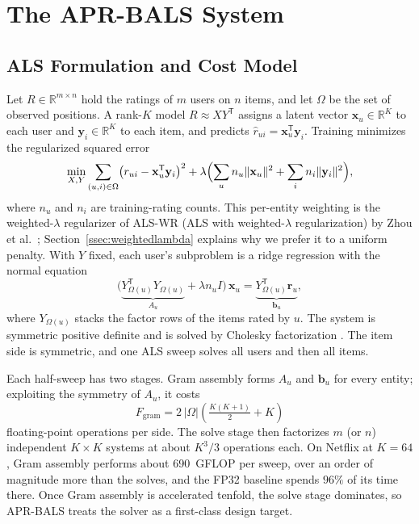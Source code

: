 \section{The APR-BALS System}
\label{sec:method}

\subsection{ALS Formulation and Cost Model}
\label{ssec:formulation}

Let $R \in \mathbb{R}^{m \times n}$ hold the ratings of $m$ users on $n$ items, and let $\Omega$ be the set of observed positions. A rank-$K$ model $R \approx XY^{\mathsf{T}}$ assigns a latent vector $\mathbf{x}_u \in \mathbb{R}^{K}$ to each user and $\mathbf{y}_i \in \mathbb{R}^{K}$ to each item, and predicts $\hat{r}_{ui} = \mathbf{x}_u^{\mathsf{T}}\mathbf{y}_i$. Training minimizes the regularized squared error
\begin{equation}
\min_{X,Y} \sum_{(u,i)\in\Omega} \bigl( r_{ui} - \mathbf{x}_u^{\mathsf{T}} \mathbf{y}_i \bigr)^{2}
+ \lambda \Bigl( \sum_{u} n_u \lVert \mathbf{x}_u \rVert^{2} + \sum_{i} n_i \lVert \mathbf{y}_i \rVert^{2} \Bigr),
\label{eq:mf_objective}
\end{equation}
where $n_u$ and $n_i$ are training-rating counts. This per-entity weighting is the weighted-$\lambda$ regularizer of ALS-WR (ALS with weighted-$\lambda$ regularization) by Zhou et al.\ \cite{zhou2008largescale}; Section~\ref{ssec:weightedlambda} explains why we prefer it to a uniform penalty. With $Y$ fixed, each user's subproblem is a ridge regression with the normal equation
\begin{equation}
\bigl( \underbrace{Y_{\Omega(u)}^{\mathsf{T}} Y_{\Omega(u)}}_{A_u} + \lambda n_u I \bigr)\, \mathbf{x}_u = \underbrace{Y_{\Omega(u)}^{\mathsf{T}} \mathbf{r}_u}_{\mathbf{b}_u},
\label{eq:als_update}
\end{equation}
where $Y_{\Omega(u)}$ stacks the factor rows of the items rated by $u$. The system is symmetric positive definite and is solved by Cholesky factorization \cite{golub2013matrix}. The item side is symmetric, and one ALS sweep solves all users and then all items.

Each half-sweep has two stages. Gram assembly forms $A_u$ and $\mathbf{b}_u$ for every entity; exploiting the symmetry of $A_u$, it costs
\begin{equation}
F_{\text{gram}} = 2\,|\Omega| \left( \tfrac{K(K+1)}{2} + K \right)
\label{eq:gram_flops}
\end{equation}
floating-point operations per side. The solve stage then factorizes $m$ (or $n$) independent $K \times K$ systems at about $K^{3}/3$ operations each. On Netflix at $K=64$, Gram assembly performs about 690~GFLOP per sweep, over an order of magnitude more than the solves, and the FP32 baseline spends $96\%$ of its time there. Once Gram assembly is accelerated tenfold, the solve stage dominates, so APR-BALS treats the solver as a first-class design target.

